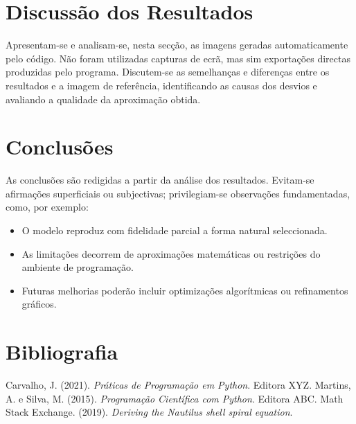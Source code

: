 \documentclass[12pt,a4paper,oneside]{extarticle}
\begin{document}
\section{Discussão dos Resultados}
Apresentam-se e analisam-se, nesta secção, as imagens geradas automaticamente pelo código.  
Não foram utilizadas capturas de ecrã, mas sim exportações directas produzidas pelo programa.  
Discutem-se as semelhanças e diferenças entre os resultados e a imagem de referência, identificando as causas dos desvios e avaliando a qualidade da aproximação obtida.  

\section{Conclusões}
As conclusões são redigidas a partir da análise dos resultados.  
Evitam-se afirmações superficiais ou subjectivas; privilegiam-se observações fundamentadas, como, por exemplo:  
\begin{itemize}
    \item O modelo reproduz com fidelidade parcial a forma natural seleccionada.  
    \item As limitações decorrem de aproximações matemáticas ou restrições do ambiente de programação.  
    \item Futuras melhorias poderão incluir optimizações algorítmicas ou refinamentos gráficos.  
\end{itemize}

\section{Bibliografia}
\begin{thebibliography}{9}
 Carvalho, J. (2021). \emph{Práticas de Programação em Python}. Editora XYZ.
 Martins, A. e Silva, M. (2015). \emph{Programação Científica com Python}. Editora ABC.
 Math Stack Exchange. (2019). \emph{Deriving the Nautilus shell spiral equation}.
\end{thebibliography}
\end{document}
